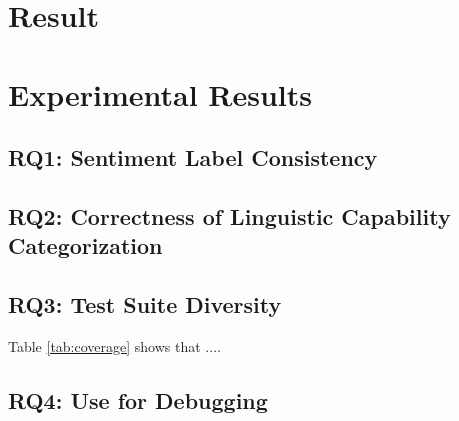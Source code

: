 \section{Result}
\label{sec:result}

\section{Experimental Results}
\label{sec:result}

\subsection{RQ1: \tool Sentiment Label Consistency}

\subsection{RQ2: Correctness of Linguistic Capability Categorization}

\subsection{RQ3: Test Suite Diversity}


Table \ref{tab:coverage} shows that ....

\subsection{RQ4: Use \tool for Debugging}
